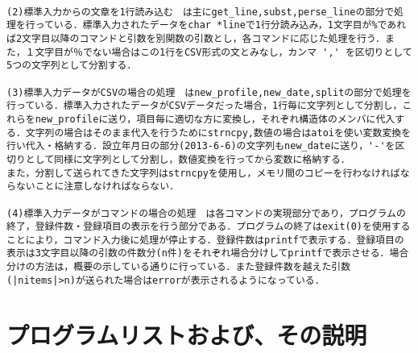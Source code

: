 \documentclass[a4j]{jarticle}
\begin{document}
{\baselineskip 3mm
\begin{verbatim}

(2)標準入力からの文章を1行読み込む　は主にget_line,subst,perse_lineの部分で処理を行っている．標準入力されたデータをchar *lineで1行分読み込み，1文字目が%であれば2文字目以降のコマンドと引数を別関数の引数とし，各コマンドに応じた処理を行う．また，１文字目が％でない場合はこの1行をCSV形式の文とみなし，カンマ ',' を区切りとして5つの文字列として分割する．

(3)標準入力データがCSVの場合の処理　はnew_profile,new_date,splitの部分で処理を行っている．標準入力されたデータがCSVデータだった場合，1行毎に文字列として分割し，これらをnew_profileに送り，項目毎に適切な方に変換し，それぞれ構造体のメンバに代入する．文字列の場合はそのまま代入を行うためにstrncpy,数値の場合はatoiを使い変数変換を行い代入・格納する．設立年月日の部分(2013-6-6)の文字列もnew_dateに送り，'-'を区切りとして同様に文字列として分割し，数値変換を行ってから変数に格納する．
また，分割して送られてきた文字列はstrncpyを使用し，メモリ間のコピーを行わなければならないことに注意しなければならない．

(4)標準入力データがコマンドの場合の処理　は各コマンドの実現部分であり，プログラムの終了，登録件数・登録項目の表示を行う部分である．プログラムの終了はexit(0)を使用することにより，コマンド入力後に処理が停止する．登録件数はprintfで表示する．登録項目の表示は3文字目以降の引数の件数分(n件)をそれぞれ場合分けしてprintfで表示させる．場合分けの方法は，概要の示している通りに行っている．また登録件数を越えた引数(|nitems|>n)が送られた場合はerrorが表示されるようになっている．

\end{verbatim}
}

%
%

\section{プログラムリストおよび、その説明}
\end{document}
